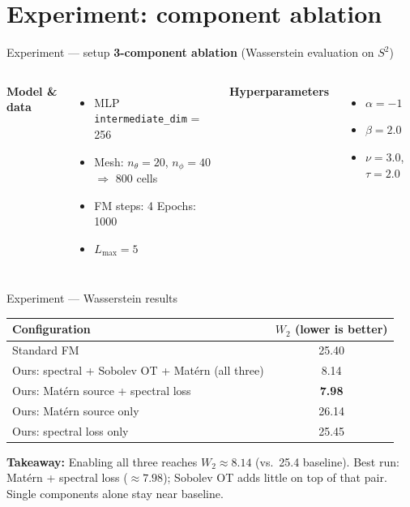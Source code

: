 \documentclass[aspectratio=169,11pt]{beamer}
\begin{document}
\section{Experiment: component ablation}

\begin{frame}{Experiment --- setup}
  \textbf{3-component ablation} (Wasserstein evaluation on $S^2$)

  \vspace{0.5em}
  \begin{columns}[T,onlytextwidth]
    \textbf{Model \& data}
    \begin{itemize}\setlength{\itemsep}{0.15em}
      \item MLP \texttt{intermediate\_dim} = 256
      \item Mesh: $n_\theta{=}20$, $n_\phi{=}40$ $\Rightarrow$ 800 cells
      \item FM steps: 4 \quad Epochs: 1000
      \item $L_{\max} = 5$
    \end{itemize}

    \textbf{Hyperparameters}
    \begin{itemize}\setlength{\itemsep}{0.15em}
      \item $\alpha = -1$
      \item $\beta = 2.0$
      \item $\nu = 3.0$, $\tau = 2.0$
    \end{itemize}
  \end{columns}
\end{frame}

\begin{frame}{Experiment --- Wasserstein results}
  \small
  \begin{table}
    \centering
    \begin{tabular}{@{}lc@{}}
      \toprule
      \textbf{Configuration} & \textbf{$W_2$ (lower is better)} \\
      \midrule
      Standard FM & 25.40 \\
      Ours: spectral + Sobolev OT + Mat\'ern (all three) & 8.14 \\
      Ours: Mat\'ern source + spectral loss & \textbf{7.98} \\
      Ours: Mat\'ern source only & 26.14 \\
      Ours: spectral loss only & 25.45 \\
      \bottomrule
    \end{tabular}
  \end{table}

  \vspace{0.5em}
  \textbf{Takeaway:} Enabling all three reaches $W_2 \approx 8.14$ (vs.\ 25.4 baseline). Best run: Mat\'ern + spectral loss ($\approx 7.98$); Sobolev OT adds little on top of that pair. Single components alone stay near baseline.
\end{frame}
\end{document}
